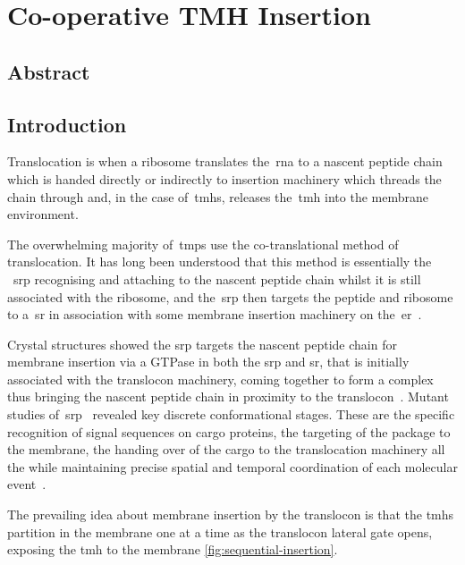 
\chapter{Co-operative TMH Insertion}
\section{Abstract}
\section{Introduction}

Translocation is when a ribosome translates the~\gls{rna} to a nascent peptide chain which is handed directly or indirectly to insertion machinery which threads the chain through and, in the case of~\gls{tmh}s, releases the~\gls{tmh} into the membrane environment.

The overwhelming majority of~\gls{tmp}s use the co-translational method of translocation.
It has long been understood that this method is essentially the ~\gls{srp} recognising and attaching to the nascent peptide chain whilst it is still associated with the ribosome, and the~\gls{srp} then targets the peptide and ribosome to a~\gls{sr} in association with some membrane insertion machinery on the~\gls{er}~\cite{Pool2005, Hessa2005}.

Crystal structures showed the \gls{srp} targets the nascent peptide chain for membrane insertion via a GTPase in both the \gls{srp} and \gls{sr}, that is initially associated with the translocon machinery, coming together to form a complex thus bringing the nascent peptide chain in proximity to the translocon~\cite{Shan2005}.
Mutant studies of~\gls{srp}~\cite{Shan2005} revealed key discrete conformational stages.
These are the specific recognition of signal sequences on cargo proteins, the targeting of the package to the membrane, the handing over of the cargo to the translocation machinery all the while maintaining precise spatial and temporal coordination of each molecular event~\cite{Saraogi2011}.

The prevailing idea about membrane insertion by the translocon is that the \gls{tmh}s partition in the membrane one at a time as the translocon lateral gate opens, exposing the \gls{tmh} to the membrane \ref{fig:sequential-insertion}.

